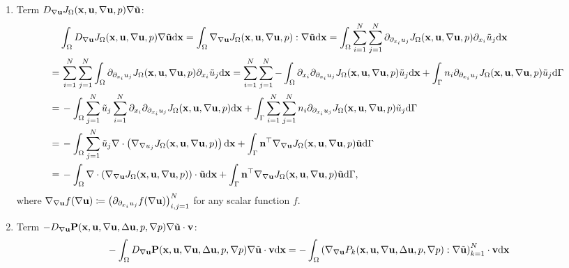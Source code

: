 \documentclass[oneside]{book}
\numberwithin{equation}{section}
\begin{document}
\begin{enumerate}[leftmargin=0in]
    \item Term $D_{\nabla{\bf u}}J_\Omega({\bf x},{\bf u},\nabla{\bf u},p)\nabla\tilde{\bf u}$:
    \begin{align*}
        &\int_\Omega D_{\nabla{\bf u}} J_\Omega({\bf x},{\bf u},\nabla{\bf u},p)\nabla\tilde{\bf u}{\rm d}{\bf x} = \int_\Omega \nabla_{\nabla{\bf u}}J_\Omega({\bf x},{\bf u},\nabla{\bf u},p):\nabla\tilde{\bf u}{\rm d}{\bf x} = \int_\Omega \sum_{i=1}^N\sum_{j=1}^N \partial_{\partial_{x_i}u_j}J_\Omega({\bf x},{\bf u},\nabla{\bf u},p)\partial_{x_i}\tilde{u}_j{\rm d}{\bf x}\\
        =&\, \sum_{i=1}^N\sum_{j=1}^N \int_\Omega \partial_{\partial_{x_i}u_j}J_\Omega({\bf x},{\bf u},\nabla{\bf u},p)\partial_{x_i}\tilde{u}_j{\rm d}{\bf x} = \sum_{i=1}^N\sum_{j=1}^N -\int_\Omega \partial_{x_i}\partial_{\partial_{x_i}u_j}J_\Omega({\bf x},{\bf u},\nabla{\bf u},p)\tilde{u}_j{\rm d}{\bf x} + \int_\Gamma n_i\partial_{\partial_{x_i}u_j}J_\Omega({\bf x},{\bf u},\nabla{\bf u},p)\tilde{u}_j{\rm d}\Gamma\\
        =&\, -\int_\Omega \sum_{j=1}^N \tilde{u}_j\sum_{i=1}^N \partial_{x_i}\partial_{\partial_{x_i}u_j}J_\Omega({\bf x},{\bf u},\nabla{\bf u},p){\rm d}{\bf x} + \int_\Gamma \sum_{i=1}^N\sum_{j=1}^N n_i\partial_{\partial_{x_i}u_j}J_\Omega({\bf x},{\bf u},\nabla{\bf u},p)\tilde{u}_j{\rm d}\Gamma\\
        =&\, -\int_\Omega \sum_{j=1}^N \tilde{u}_j\nabla\cdot\left(\nabla_{\nabla u_j}J_\Omega({\bf x},{\bf u},\nabla{\bf u},p)\right){\rm d}{\bf x} + \int_\Gamma {\bf n}^\top\nabla_{\nabla{\bf u}}J_\Omega({\bf x},{\bf u},\nabla{\bf u},p)\tilde{\bf u}{\rm d}\Gamma\\
        =&\, -\int_\Omega \nabla\cdot\left(\nabla_{\nabla{\bf u}}J_\Omega({\bf x},{\bf u},\nabla{\bf u},p)\right)\cdot\tilde{\bf u}{\rm d}{\bf x} + \int_\Gamma {\bf n}^\top\nabla_{\nabla{\bf u}}J_\Omega({\bf x},{\bf u},\nabla{\bf u},p)\tilde{\bf u}{\rm d}\Gamma,
    \end{align*}
    where $\nabla_{\nabla{\bf u}} f(\nabla{\bf u})\coloneqq\left(\partial_{\partial_{x_i}u_j}f(\nabla{\bf u})\right)_{i,j=1}^N$ for any scalar function $f$.
    \item Term $- D_{\nabla{\bf u}}{\bf P}({\bf x},{\bf u},\nabla{\bf u},\Delta{\bf u},p,\nabla p)\nabla\tilde{\bf u}\cdot{\bf v}$:
    \begin{align*}
        &-\int_\Omega D_{\nabla{\bf u}}{\bf P}({\bf x},{\bf u},\nabla{\bf u},\Delta{\bf u},p,\nabla p)\nabla\tilde{\bf u}\cdot{\bf v}{\rm d}{\bf x} = -\int_\Omega \left(\nabla_{\nabla{\bf u}}P_k({\bf x},{\bf u},\nabla{\bf u},\Delta{\bf u},p,\nabla p):\nabla\tilde{\bf u}\right)_{k=1}^N\cdot{\bf v}{\rm d}{\bf x}\\

\end{align*}
\end{enumerate}
\end{document}
